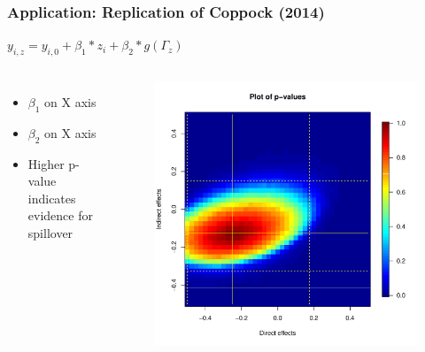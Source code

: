 \documentclass{beamer}
\begin{document}
\begin{frame}
\frametitle{Application: Replication of Coppock (2014)}
\LARGE {$y_{i,z} = y_{i,0} + \beta_1*z_i + \beta_2*g(\Gamma_z)$}
\begin{columns}[c]

\centering
\begin{itemize}
\item \LARGE {$\beta_1$ on X axis}
\vspace{2mm}
\item \LARGE {$\beta_2$ on X axis}
\vspace{2mm}
\item \LARGE {Higher p-value indicates evidence for spillover}
\end{itemize}

\begin{figure}
\centering
\includegraphics[scale=0.3]{pval_plot_coppock_replication.pdf}
\end{figure}

\end{columns}
\end{frame}
\end{document}
